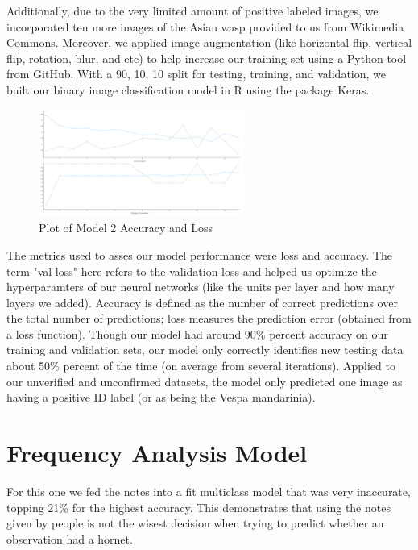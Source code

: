 \documentclass[letterpaper]{article}
\begin{document}
Additionally, due to the very limited amount of positive labeled images, we incorporated ten more images of the Asian wasp provided to us from Wikimedia Commons. Moreover, we applied image augmentation (like horizontal flip, vertical flip, rotation, blur, and etc) to help increase our training set using a Python tool from GitHub. With a 90, 10, 10 split for testing, training, and validation, we built our binary image classification model in R using the package Keras. 

\begin{figure}[H]
    \centering
    \includegraphics[width=0.6\textwidth]{images/trainingTestingPlot.png}
    \caption{Plot of Model 2 Accuracy and Loss}
\end{figure}


The metrics used to asses our model performance were loss and accuracy. The term "val loss" here refers to the validation loss and helped us optimize the hyperparamters of our neural networks (like the units per layer and how many layers we added). Accuracy is defined as the number of correct predictions over the total number of predictions; loss measures the prediction error (obtained from a loss function). Though our model had around 90\% percent accuracy on our training and validation sets, our model only correctly identifies new testing data about 50\% percent of the time (on average from several iterations). Applied to our unverified and unconfirmed datasets, the model only predicted one image as having a positive ID label (or as being the Vespa mandarinia).

\section{Frequency Analysis Model}

For this one we fed the notes into a fit multiclass model that was very inaccurate, topping 21\% for the highest accuracy. This demonstrates that using the notes given by people is not the wisest decision when trying to predict whether an observation had a hornet.
\end{document}
